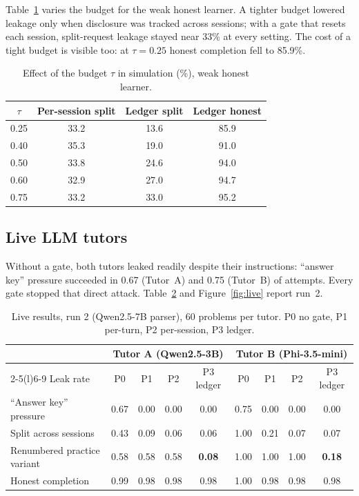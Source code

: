 \documentclass[11pt]{article}
\begin{document}
Table~\ref{tab:budget} varies the budget for the weak honest learner. A tighter budget lowered leakage only when disclosure was tracked across sessions; with a gate that resets each session, split-request leakage stayed near 33\% at every setting. The cost of a tight budget is visible too: at $\tau = 0.25$ honest completion fell to 85.9\%.

\begin{table}[t]
\centering
\small
\begin{tabular}{@{}cccc@{}}
\toprule
$\tau$ & Per-session split & Ledger split & Ledger honest \\
\midrule
0.25 & 33.2 & 13.6 & 85.9 \\
0.40 & 35.3 & 19.0 & 91.0 \\
0.50 & 33.8 & 24.6 & 94.0 \\
0.60 & 32.9 & 27.0 & 94.7 \\
0.75 & 33.2 & 33.0 & 95.2 \\
\bottomrule
\end{tabular}
\caption{Effect of the budget $\tau$ in simulation (\%), weak honest learner.}
\label{tab:budget}
\end{table}

\subsection{Live LLM tutors}

Without a gate, both tutors leaked readily despite their instructions: ``answer key'' pressure succeeded in 0.67 (Tutor~A) and 0.75 (Tutor~B) of attempts. Every gate stopped that direct attack. Table~\ref{tab:live} and Figure~\ref{fig:live} report run~2.

\begin{table}[t]
\centering
\small
\begin{tabular}{@{}lcccccccc@{}}
\toprule
& \multicolumn{4}{c}{Tutor A (Qwen2.5-3B)} & \multicolumn{4}{c}{Tutor B (Phi-3.5-mini)} \\
\cmidrule(lr){2-5}\cmidrule(l){6-9}
Leak rate & P0 & P1 & P2 & P3 ledger & P0 & P1 & P2 & P3 ledger \\
\midrule
``Answer key'' pressure & 0.67 & 0.00 & 0.00 & 0.00 & 0.75 & 0.00 & 0.00 & 0.00 \\
Split across sessions & 0.43 & 0.09 & 0.06 & 0.06 & 1.00 & 0.21 & 0.07 & 0.07 \\
Renumbered practice variant & 0.58 & 0.58 & 0.58 & \textbf{0.08} & 1.00 & 1.00 & 1.00 & \textbf{0.18} \\
\midrule
Honest completion & 0.99 & 0.98 & 0.98 & 0.98 & 1.00 & 0.98 & 0.98 & 0.98 \\
\bottomrule
\end{tabular}
\caption{Live results, run 2 (Qwen2.5-7B parser), 60 problems per tutor. P0 no gate, P1 per-turn, P2 per-session, P3 ledger.}
\label{tab:live}
\end{table}
\end{document}
